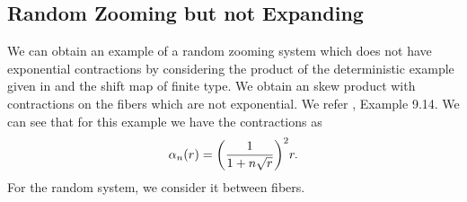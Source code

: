 \documentclass[12pt,a4paper]{amsart}
\theoremstyle{plain}
\begin{document}
	
	\subsection{Random Zooming but not Expanding} We can obtain an example of a random zooming system which does not have exponential contractions by considering the product of the deterministic example given in \cite{Pi1} and the shift map of finite type. We obtain an skew product with contractions on the fibers which are not exponential. We refer \cite{Pi1}, Example 9.14. We can see that for this example we have the contractions as
	\[
	\alpha_{n}(r) = \bigg{(}\frac{1}{1 + n\sqrt{r}}\bigg{)}^{2}r.
	\]
	For the random system, we consider it between fibers.
	
	
	
	
\end{document}
